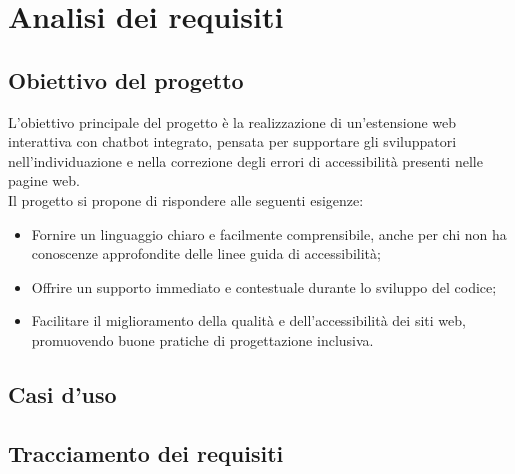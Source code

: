 \chapter{Analisi dei requisiti}
\label{chap:analisi-requisiti}

\section{Obiettivo del progetto}
\label{sec:obiettivo}
\noindent L’obiettivo principale del progetto è la realizzazione di un’estensione web interattiva con chatbot integrato, pensata per supportare gli sviluppatori nell’individuazione e nella correzione degli errori di accessibilità presenti nelle pagine web. \\Il progetto si propone di rispondere alle seguenti esigenze:
\begin{itemize}
    \item Fornire un linguaggio chiaro e facilmente comprensibile, anche per chi non ha conoscenze approfondite delle linee guida di accessibilità;
    \item Offrire un supporto immediato e contestuale durante lo sviluppo del codice;
    \item Facilitare il miglioramento della qualità e dell’accessibilità dei siti web, promuovendo buone pratiche di progettazione inclusiva.
\end{itemize}

\section{Casi d'uso}
\label{sec:uc}

\section{Tracciamento dei requisiti}
\label{sec:rq}
